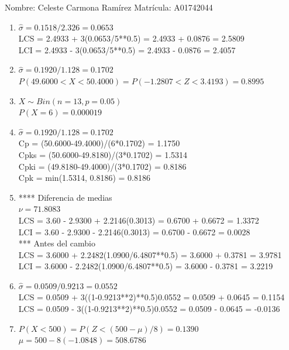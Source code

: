 \documentclass[8pt]{report}
\begin{document}
 \newpage

Nombre: \underline{\hspace*{.2in}}
Celeste Carmona Ramírez
\underline{\hspace*{.2in}} \quad Matr\'icula:\underline{\hspace*{.2in}}
A01742044
\underline{\hspace*{.2in}} \\

\begin{enumerate}
\item $\hat\sigma = 0.1518/2.326 = 0.0653$\\
LCS = 2.4933 + 3(0.0653/5**0.5) = 2.4933 + 0.0876 = 2.5809\\
LCI = 2.4933 - 3(0.0653/5**0.5) = 2.4933 - 0.0876 = 2.4057
\item $\hat\sigma = 0.1920/1.128 = 0.1702$\\
$P(49.6000 < X < 50.4000) = P(-1.2807 < Z < 3.4193) = 0.8995$\\
\item $X \sim Bin(n=13, p=0.05)$\\
$P(X = 6) = 0.000019$
\item $\hat\sigma = 0.1920/1.128 = 0.1702$\\
Cp = (50.6000-49.4000)/(6*0.1702) = 1.1750\\
Cpks = (50.6000-49.8180)/(3*0.1702) = 1.5314\\
Cpki = (49.8180-49.4000)/(3*0.1702) = 0.8186\\
Cpk = min(1.5314, 0.8186) = 0.8186
\item **** Diferencia de medias\\
$\nu = 71.8083$\\
LCS = 3.60 - 2.9300 + 2.2146(0.3013) = 0.6700 + 0.6672 = 1.3372\\
LCI = 3.60 - 2.9300 - 2.2146(0.3013) = 0.6700 - 0.6672 = 0.0028\\
*** Antes del cambio\\
LCS = 3.6000 + 2.2482(1.0900/6.4807**0.5) = 3.6000 + 0.3781 = 3.9781\\
LCI = 3.6000 - 2.2482(1.0900/6.4807**0.5) = 3.6000 - 0.3781 = 3.2219\\
\item $\hat\sigma = 0.0509/0.9213 = 0.0552$\\
LCS = 0.0509 + 3((1-0.9213**2)**0.5)0.0552 = 0.0509 + 0.0645 = 0.1154\\
LCS = 0.0509 - 3((1-0.9213**2)**0.5)0.0552 = 0.0509 - 0.0645 = -0.0136
\item $P(X < 500) = P(Z < (500-\mu)/8) = 0.1390$\\
$\mu = 500 - 8(-1.0848) = 508.6786$\\
\end{enumerate}
\end{document}
